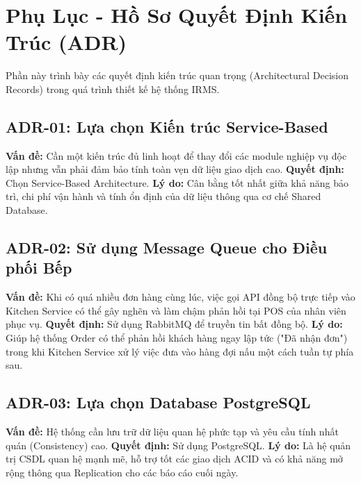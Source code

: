 \chapter{Phụ Lục - Hồ Sơ Quyết Định Kiến Trúc (ADR)}

Phần này trình bày các quyết định kiến trúc quan trọng (Architectural Decision Records) trong quá trình thiết kế hệ thống IRMS.

\section{ADR-01: Lựa chọn Kiến trúc Service-Based}
\textbf{Vấn đề:} Cần một kiến trúc đủ linh hoạt để thay đổi các module nghiệp vụ độc lập nhưng vẫn phải đảm bảo tính toàn vẹn dữ liệu giao dịch cao.
\newline
\textbf{Quyết định:} Chọn Service-Based Architecture.
\newline
\textbf{Lý do:} Cân bằng tốt nhất giữa khả năng bảo trì, chi phí vận hành và tính ổn định của dữ liệu thông qua cơ chế Shared Database.

\section{ADR-02: Sử dụng Message Queue cho Điều phối Bếp}
\textbf{Vấn đề:} Khi có quá nhiều đơn hàng cùng lúc, việc gọi API đồng bộ trực tiếp vào Kitchen Service có thể gây nghẽn và làm chậm phản hồi tại POS của nhân viên phục vụ.
\newline
\textbf{Quyết định:} Sử dụng RabbitMQ để truyền tin bất đồng bộ.
\newline
\textbf{Lý do:} Giúp hệ thống Order có thể phản hồi khách hàng ngay lập tức ("Đã nhận đơn") trong khi Kitchen Service xử lý việc đưa vào hàng đợi nấu một cách tuần tự phía sau.

\section{ADR-03: Lựa chọn Database PostgreSQL}
\textbf{Vấn đề:} Hệ thống cần lưu trữ dữ liệu quan hệ phức tạp và yêu cầu tính nhất quán (Consistency) cao.
\newline
\textbf{Quyết định:} Sử dụng PostgreSQL.
\newline
\textbf{Lý do:} Là hệ quản trị CSDL quan hệ mạnh mẽ, hỗ trợ tốt các giao dịch ACID và có khả năng mở rộng thông qua Replication cho các báo cáo cuối ngày.
